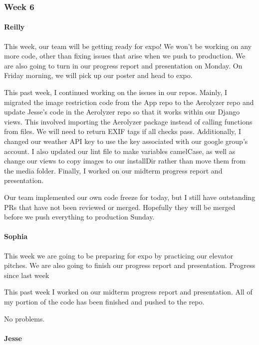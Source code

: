 \documentclass[onecolumn, draftclsnofoot,10pt, compsoc]{IEEEtran}
\begin{document}
\begin{flushleft}
\subsubsection{Week 6}
\paragraph{Reilly}
 
This week, our team will be getting ready for expo! We won't be working on any more code, other than fixing issues that arise when we push to production. We are also going to turn in our progress report and presentation on Monday. On Friday morning, we will pick up our poster and head to expo.
 
 
This past week, I continued working on the issues in our repos. Mainly, I migrated the image restriction code from the App repo to the Aerolyzer repo and update Jesse's code in the Aerolyzer repo so that it works within our Django views. This involved importing the Aerolyzer package instead of calling functions from files. We will need to return EXIF tags if all checks pass. Additionally, I changed our weather API key to use the key associated with our google group's account. I also updated our lint file to make variables camelCase, as well as change our views to copy images to our installDir rather than move them from the media folder. Finally, I worked on our midterm progress report and presentation.
 
 
Our team implemented our own code freeze for today, but I still have outstanding PRs that have not been reviewed or merged. Hopefully they will be merged before we push everything to production Sunday.
 
\paragraph{Sophia}
 
This week we are going to be preparing for expo by practicing our elevator pitches. We are also going to finish our progress report and presentation. Progress since last week
 
This past week I worked on our midterm progress report and presentation. All of my portion of the code has been finished and pushed to the repo.
 
 
No problems.
 
\paragraph{Jesse}
 

\end{flushleft}
\end{document}
